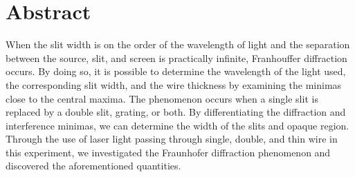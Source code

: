 \section{Abstract}
	When the slit width is on the order of the wavelength of light and the separation between the source, slit, and screen is practically infinite, Franhouffer diffraction occurs. By doing so, it is possible to determine the wavelength of the light used, the corresponding slit width, and the wire thickness by examining the minimas close to the central maxima. The phenomenon occurs when a single slit is replaced by a double slit, grating, or both. By differentiating the diffraction and interference minimas, we can determine the width of the slits and opaque region. Through the use of laser light passing through single, double, and thin wire in this experiment, we investigated the Fraunhofer diffraction phenomenon and discovered the aforementioned quantities.